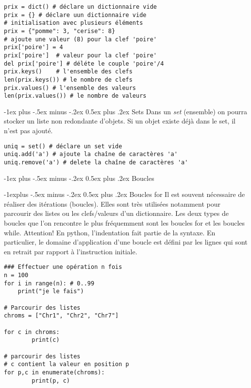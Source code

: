 \documentclass[10pt,landscape]{article}
\makeatletter
\renewcommand{\section}{\@startsection{section}{1}{0mm}%
                                {-1ex plus -.5ex minus -.2ex}%
                                {0.5ex plus .2ex}%
                                {\normalfont\large\bfseries}}
\renewcommand{\subsection}{\@startsection{subsection}{2}{0mm}%
                                {-1explus -.5ex minus -.2ex}%
                                {0.5ex plus .2ex}%
                                {\normalfont\normalsize\bfseries}}
\makeatother
\begin{document}
\begin{multicols}{3}
\begin{lstlisting}
prix = dict() # déclare un dictionnaire vide
prix = {} # déclare uun dictionnaire vide
# initialisation avec plusieurs éléments
prix = {"pomme": 3, "cerise": 8}
# ajoute une valeur (8) pour la clef 'poire'  
prix['poire'] = 4 
prix['poire']  # valeur pour la clef 'poire'
del prix['poire'] # déléte le couple 'poire'/4
prix.keys()    # l'ensemble des clefs
len(prix.keys()) # le nombre de clefs
prix.values() # l'ensemble des valeurs
len(prix.values()) # le nombre de valeurs
\end{lstlisting}


\section{Sets}
Dans  un \textit{set} (ensemble) on pourra stocker un liste non redondante d'objets. Si un objet existe déjà dans le set, il n'est pas ajouté.

\begin{lstlisting}
uniq = set() # déclare un set vide
uniq.add('a') # ajoute la chaîne de caractères 'a'
uniq.remove('a') # delete la chaîne de caractères 'a'
\end{lstlisting}

\section{Boucles}

\subsection{Boucles for}
Il est souvent nécessaire de réaliser des itérations (boucles). Elles sont très utilisées notamment pour parcourir des listes ou les clefs/valeurs d'un dictionnaire. Les deux types de boucles que l'on rencontre le plus fréquemment sont les boucles for et les boucles while.
Attention! En python, l'indentation fait partie de la syntaxe. En particulier, le domaine d'application d'une boucle est défini par les lignes qui sont en retrait par rapport à l'instruction initiale.

\begin{lstlisting}
### Effectuer une opération n fois
n = 100
for i in range(n): # 0..99
	print("je le fais")

# Parcourir des listes
chroms = ["Chr1", "Chr2", "Chr7"]

for c in chroms:
        print(c)

# parcourir des listes
# c contient la valeur en position p        
for p,c in enumerate(chroms):
        print(p, c)


\end{lstlisting}
\end{multicols}
\end{document}
